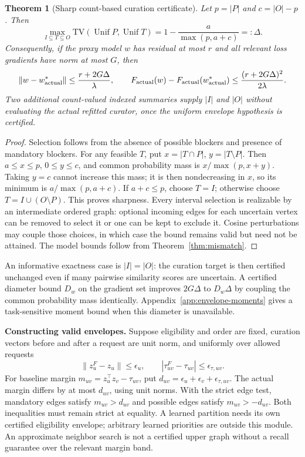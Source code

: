 \documentclass[11pt,a4paper]{article}
\newtheorem{theorem}{Theorem}[section]
\theoremstyle{definition}\newtheorem{definition}[theorem]{Definition}
\newcommand{\minus}{\setminus}
\begin{document}
\begin{theorem}[Sharp count-based curation certificate]\label{thm:envelope}
Let $p=|P|$ and $c=|O|-p$. Then
\begin{equation}\label{eq:envelope}
 \max_{I\subseteq T\subseteq O}\mathrm{TV}(\operatorname{Unif}P,\operatorname{Unif}T)
 =1-\frac{a}{\max(p,a+c)}=: \Delta.
\end{equation}
Consequently, if the proxy model $w$ has residual at most $r$ and all relevant loss gradients have norm at most $G$, then
\[
 \|w-w^*_{\rm actual}\|\le\frac{r+2G\Delta}{\lambda},\qquad
 F_{\rm actual}(w)-F_{\rm actual}(w^*_{\rm actual})
 \le\frac{(r+2G\Delta)^2}{2\lambda}.
\]
Two additional count-valued indexed summaries supply $|I|$ and $|O|$ without evaluating the actual refitted curator, once the uniform envelope hypothesis is certified.
\end{theorem}
\begin{proof}
Selection follows from the absence of possible blockers and presence of mandatory blockers. For any feasible $T$, put $x=|T\cap P|$, $y=|T\minus P|$. Then $a\le x\le p$, $0\le y\le c$, and common probability mass is $x/\max(p,x+y)$. Taking $y=c$ cannot increase this mass; it is then nondecreasing in $x$, so its minimum is $a/\max(p,a+c)$. If $a+c\le p$, choose $T=I$; otherwise choose $T=I\cup(O\minus P)$. This proves sharpness. Every interval selection is realizable by an intermediate ordered graph: optional incoming edges for each uncertain vertex can be removed to select it or one can be kept to exclude it. Cosine perturbations may couple those choices, in which case the bound remains valid but need not be attained. The model bounds follow from Theorem~\ref{thm:mismatch}.
\end{proof}
An informative exactness case is $|I|=|O|$: the curation target is then certified unchanged even if many pairwise similarity scores are uncertain. A certified diameter bound $D_w$ on the gradient set improves $2G\Delta$ to $D_w\Delta$ by coupling the common probability mass identically. Appendix~\ref{app:envelope-moments} gives a task-sensitive moment bound when this diameter is unavailable.

\textbf{Constructing valid envelopes.} Suppose eligibility and order are fixed, curation vectors before and after a request are unit norm, and uniformly over allowed requests
\[
 \|z_u^F-z_u\|\le\epsilon_u,\qquad
 |\tau_{uv}^F-\tau_{uv}|\le\epsilon_{\tau,uv}.
\]
For baseline margin $m_{uv}=z_u^\top z_v-\tau_{uv}$, put $d_{uv}=\epsilon_u+\epsilon_v+\epsilon_{\tau,uv}$. The actual margin differs by at most $d_{uv}$, using unit norms. With the strict edge test, mandatory edges satisfy $m_{uv}>d_{uv}$ and possible edges satisfy $m_{uv}>-d_{uv}$. Both inequalities must remain strict at equality. A learned partition needs its own certified eligibility envelope; arbitrary learned priorities are outside this module. An approximate neighbor search is not a certified upper graph without a recall guarantee over the relevant margin band.
\end{document}
